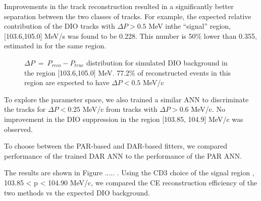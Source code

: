 Improvements in the track reconstruction resulted in a significantly better separation
between the two classes of tracks. For example, the expected relative contribution of
the DIO tracks with $\Delta{P} > 0.5$ MeV inthe ``signal'' region, [103.6,105.0] MeV/s was
found to be 0.228. This number is 50\% lower than 0.355, estimated in \cite{MU2E_4595_ANN_TRAINING}
for the same region.
\begin{figure}
\caption{
  \label{fig:sindrum_ii_fig_08_fit} 
  $\Delta P ~=~ P_{reco} -P_{true}$ distribution for simulated DIO background in the region [103.6,105.0] MeV.
  77.2\% of reconstructed events in this region are expected to have $\Delta P < 0.5$ MeV/c
}
\end{figure}

To explore the parameter space, we also trained a similar ANN to discriminate the tracks for
$\Delta{P} < 0.25$ MeV/c from tracks with $\Delta{P} > 0.6$ MeV/c. No improvement in the DIO
suppression in the region [103.85, 104.9] MeV/c was observed. 

To choose between the PAR-based and DAR-based fitters, we compared performance of the
trained DAR ANN to the performance of the PAR ANN.

The results are shown in Figure ..... .
Using the CD3 choice of the signal region , 103.85 < p < 104.90 MeV/c, we compared the
CE reconstruction efficiency of the two methods vs the expected DIO background.

